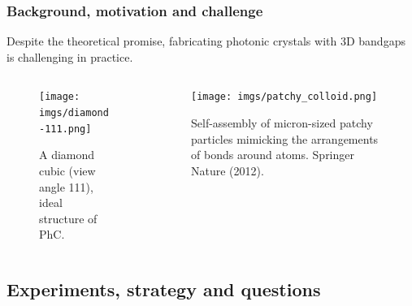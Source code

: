 \begin{frame}
  \frametitle{Background, motivation and challenge}

  Despite the theoretical promise, fabricating photonic crystals with 3D bandgaps is challenging in practice.
  \bigskip
  
  \pause
  \begin{columns}[T]
    \begin{column}{0.45\textwidth}
      \begin{figure}
        \centering
        \texttt{[image: imgs/diamond-111.png]}
        \caption{A diamond cubic (view angle 111), ideal structure of PhC.}
      \end{figure}
    \end{column}

    \pause
    \begin{column}{0.45\textwidth}
      \begin{figure}
        \centering
        \texttt{[image: imgs/patchy\_colloid.png]}
        \caption{Self-assembly of micron-sized patchy particles mimicking the arrangements of bonds around atoms.
        \textcopyright \enspace Springer Nature (2012).}
      \end{figure}
    \end{column}

  \end{columns}
  \vskip0.1cm
  
  \pause

\end{frame}

\hypertarget{experiment}{%
  \subsection{Experiments, strategy and questions}}

